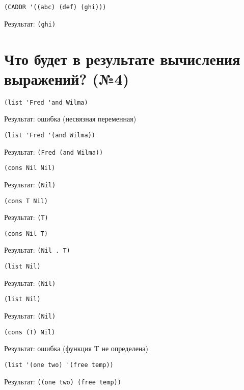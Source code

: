 \begin{lstlisting}
(CADDR '((abc) (def) (ghi)))
\end{lstlisting}
Результат: \texttt{(ghi)}

\section{Что будет в результате вычисления выражений? (№4)}

\begin{lstlisting}
(list 'Fred 'and Wilma)
\end{lstlisting}
Результат: ошибка (несвязная переменная)
\vspace{20mm}

\begin{lstlisting}
(list 'Fred '(and Wilma))
\end{lstlisting}
Результат: \texttt{(Fred (and Wilma))}
\vspace{20mm}

\begin{lstlisting}
(cons Nil Nil)
\end{lstlisting}
Результат: \texttt{(Nil)}
\vspace{20mm}

\begin{lstlisting}
(cons T Nil)
\end{lstlisting}
Результат: \texttt{(T)}
\vspace{20mm}

\begin{lstlisting}
(cons Nil T)
\end{lstlisting}
Результат: \texttt{(Nil . T)}
\vspace{20mm}

\begin{lstlisting}
(list Nil)
\end{lstlisting}
Результат: \texttt{(Nil)}
\vspace{20mm}

\begin{lstlisting}
(list Nil)
\end{lstlisting}
Результат: \texttt{(Nil)}
\vspace{20mm}

\begin{lstlisting}
(cons (T) Nil)
\end{lstlisting}
Результат: ошибка (функция T не определена)
\vspace{20mm}

\begin{lstlisting}
(list '(one two) '(free temp))
\end{lstlisting}
Результат: \texttt{((one two) (free temp))}
\vspace{20mm}


